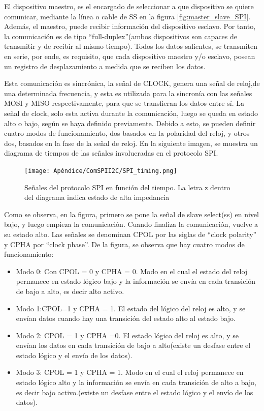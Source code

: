 El dispositivo maestro, es el encargado de seleccionar a que dispositivo se quiere comunicar, mediante la línea o cable de SS en la figura \ref{fig:master_slave_SPI}. Además, el maestro, puede recibir información del dispositivo esclavo. Por tanto, la comunicación es de tipo ``full-duplex''(ambos dispositivos son capaces de transmitir y de recibir al mismo tiempo). Todos los datos salientes, se transmiten en serie, por ende, es requisito, que cada dispositivo maestro y/o esclavo, posean un registro de desplazamiento a medida que se reciben los datos.     
 
Esta comunicación es sincrónica, la señal de CLOCK, genera una señal de reloj,de una determinada frecuencia, y esta es utilizada para la sincronía con las señales MOSI y MISO respectivamente, para que se transfieran los datos entre sí. La señal de clock, solo esta activa durante la comunicación, luego se queda en estado alto o bajo, según se haya definido previamente. Debido a esto, se pueden definir cuatro modos de funcionamiento, dos basados en la polaridad del reloj, y otros dos, basados en la fase de la señal de reloj. En la siguiente imagen, se muestra un diagrama de tiempos de las señales involucradas en el protocolo SPI.  

\begin{figure}[ht]
	\texttt{[image: Apéndice/ComSPII2C/SPI\_timing.png]}
	\caption{Señales del protocolo SPI en función del tiempo. La letra z dentro del diagrama indica estado de alta impedancia}
	\label{fig:señales_SPI}
\end{figure}

Como se observa, en la figura, primero se pone la señal de slave select(ss) en nivel bajo, y luego empieza la comunicación. Cuando finaliza la comunicación, vuelve a su estado alto. Las señales se denominan CPOL por las siglas de ``clock polarity'' y CPHA por ``clock phase''. De la figura, se observa que hay cuatro modos de funcionamiento: 

\begin{itemize}
	\item Modo 0: Con CPOL = 0 y CPHA = 0. Modo en el cual el estado del reloj permanece en estado lógico bajo y la información se envía en cada transición de bajo a alto, es decir alto activo.
	\item Modo 1:CPOL=1 y CPHA = 1. El estado del lógico del reloj es alto, y se envían datos cuando hay una transición del estado alto al estado bajo. 
	\item Modo 2: CPOL = 1 y CPHA =0. El estado lógico del reloj es alto, y se envían los datos en cada transición de bajo a alto(existe un desfase entre el estado lógico y el envío de los datos).   
	\item Modo 3: CPOL = 1 y CPHA = 1. Modo en el cual el reloj permanece en estado lógico alto y la información se envía en cada transición de alto a bajo, es decir bajo activo.(existe un desfase entre el estado lógico y el envío de los datos). 
\end{itemize}

